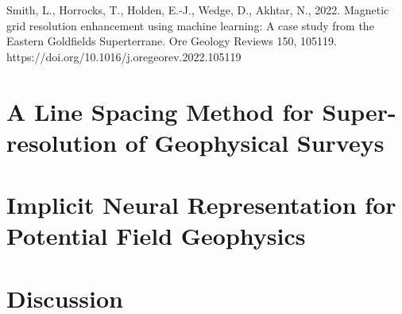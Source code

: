 \documentclass[12pt,a4paper]{report} %
\begin{document}
Smith, L., Horrocks, T., Holden, E.-J., Wedge, D., Akhtar, N., 2022. Magnetic grid resolution enhancement using machine learning: A case study from the Eastern Goldfields Superterrane. Ore Geology Reviews 150, 105119.
https://doi.org/10.1016/j.oregeorev.2022.105119


\chapter{A Line Spacing Method for Super-resolution of Geophysical Surveys}
\label{paper2}
% 

\chapter{Implicit Neural Representation for Potential Field Geophysics}
\label{paper3}
% 

\chapter{Discussion}

\end{document}
